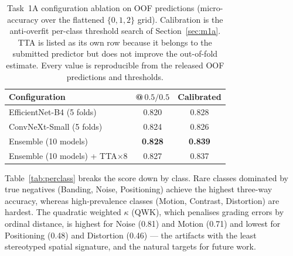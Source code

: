 \documentclass[runningheads]{llncs}
\begin{document}
\begin{table}[htbp]
\caption{Task~1A configuration ablation on OOF predictions (micro-accuracy over
the flattened $\{0,1,2\}$ grid). Calibration is the anti-overfit per-class threshold
search of Section~\ref{sec:m1a}. TTA is listed as its own row because it belongs to
the submitted predictor but does not improve the out-of-fold estimate. Every value is
reproducible from the released OOF predictions and thresholds.}
\label{tab:ensemble}
\centering
\setlength{\tabcolsep}{8pt}
\begin{tabular}{lcc}
\toprule
Configuration & @\,$0.5/0.5$ & Calibrated \\
\midrule
EfficientNet-B4 (5 folds)           & 0.820 & 0.828 \\
ConvNeXt-Small (5 folds)            & 0.824 & 0.826 \\
Ensemble (10 models)                & \textbf{0.828} & \textbf{0.839} \\
Ensemble (10 models) + TTA$\times$8 & 0.827 & 0.837 \\
\bottomrule
\end{tabular}
\end{table}

Table~\ref{tab:perclass} breaks the score down by class. Rare classes dominated
by true negatives (Banding, Noise, Positioning) achieve the highest three-way
accuracy, whereas high-prevalence classes (Motion, Contrast, Distortion) are
hardest. The quadratic weighted $\kappa$ (QWK), which penalises grading errors by
ordinal distance, is highest for Noise (0.81) and Motion (0.71) and lowest for
Positioning (0.48) and Distortion (0.46) --- the artifacts with the least
stereotyped spatial signature, and the natural targets for future work.
\end{document}

